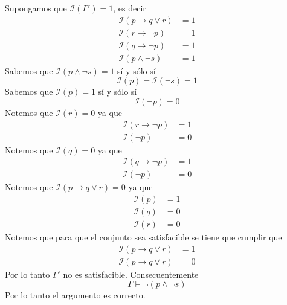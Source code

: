 \documentclass[a4paper]{article}
\begin{document}
Supongamos que \(\mathcal{I}\left(\Gamma'\right) = 1\), es decir
\begin{align*}
    \mathcal{I}\left(p \to q \lor r\right) &= 1 \\
    \mathcal{I}\left(r \to \lnot p\right) &= 1 \\
    \mathcal{I}\left(q \to \lnot p\right) &= 1 \\
    \mathcal{I}\left(p \land \lnot s\right) &= 1
\end{align*}
Sabemos que \(\mathcal{I}\left(p \land \lnot s\right) = 1\) sí y sólo sí
\[
    \mathcal{I}\left(p\right) = \mathcal{I}\left(\lnot s\right) = 1
\]
Sabemos que \(\mathcal{I}\left(p\right) = 1\) sí y sólo sí
\[
    \mathcal{I}\left(\neg p\right) = 0
\]
Notemos que \(\mathcal{I}\left(r\right) = 0\) ya que
\begin{align*}
    \mathcal{I}\left(r \to \lnot p\right) &= 1 \\
    \mathcal{I}\left(\neg p\right) &= 0
\end{align*}
Notemos que \(\mathcal{I}\left(q\right) = 0\) ya que
\begin{align*}
    \mathcal{I}\left(q \to \lnot p\right) &= 1 \\
    \mathcal{I}\left(\neg p\right) &= 0
\end{align*}
Notemos que \(\mathcal{I}\left(p \to q \lor r\right) = 0\) ya que
\begin{align*}
    \mathcal{I}\left(p\right) &= 1 \\
    \mathcal{I}\left(q\right) &= 0 \\
    \mathcal{I}\left(r\right) &= 0
\end{align*}
Notemos que para que el conjunto sea satisfacible se tiene que cumplir que
\begin{align*}
    \mathcal{I}\left(p \to q \lor r\right) &= 1 \\
    \mathcal{I}\left(p \to q \lor r\right) &= 0
\end{align*}
Por lo tanto \(\Gamma'\) no es satisfacible. Consecuentemente
\[
    \Gamma \models \lnot (p \land \lnot s)
\]
Por lo tanto el argumento es correcto.
\end{document}
